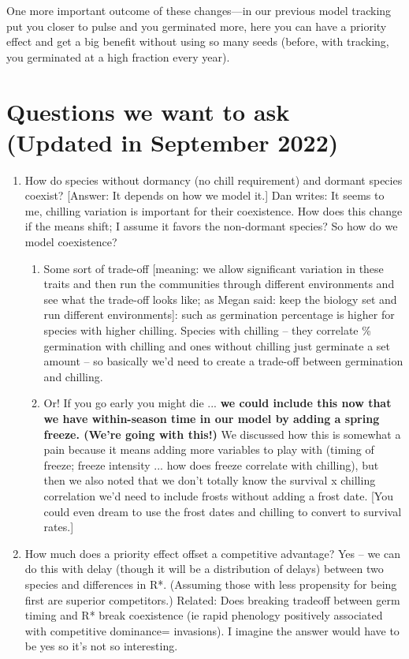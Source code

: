 \documentclass[11pt,letter]{article}
\begin{document}
One more important outcome of these changes---in our previous model tracking put you closer to pulse and you germinated more, here you can have a priority effect and get a big benefit without using so many seeds (before, with tracking, you germinated at a high fraction every year). 

\section{Questions we want to ask (Updated in September 2022)}
\begin{enumerate}
\item How do species without dormancy (no chill requirement) and dormant species coexist? [Answer: It depends on how we model it.] Dan writes: It seems to me, chilling variation is important for their coexistence. How does this change if the means shift; I assume it favors the non-dormant species? So how do we model coexistence?
\begin{enumerate}
\item Some sort of trade-off [meaning: we allow significant variation in these traits and then run the communities through different environments and see what the trade-off looks like; as Megan said: keep the biology set and run different environments]: such as germination percentage is higher for species with higher chilling. Species with chilling -- they correlate \% germination with chilling and ones without chilling just germinate a set amount -- so basically we'd need to create a trade-off between germination and chilling. 
\item Or! If you go early you might die ... {\bf we could include this now that we have within-season time in our model by adding a spring freeze. (We're going with this!)} We discussed how this is somewhat a pain because it means adding more variables to play with (timing of freeze; freeze intensity ... how does freeze correlate with chilling), but then we also noted that we don't totally know the survival x chilling correlation we'd need to include frosts without adding a frost date. [You could even dream to use the frost dates and chilling to convert to survival rates.] 
\end{enumerate}
\item How much does a priority effect offset a competitive advantage? Yes -- we can do this with delay (though it will be a distribution of delays) between two species and differences in R*. (Assuming those with less propensity for being first are superior competitors.) Related: Does breaking tradeoff between germ timing and R* break coexistence (ie rapid phenology positively associated with competitive dominance= invasions). I imagine the answer would have to be yes so it's not so interesting.

\end{enumerate}
\end{document}
